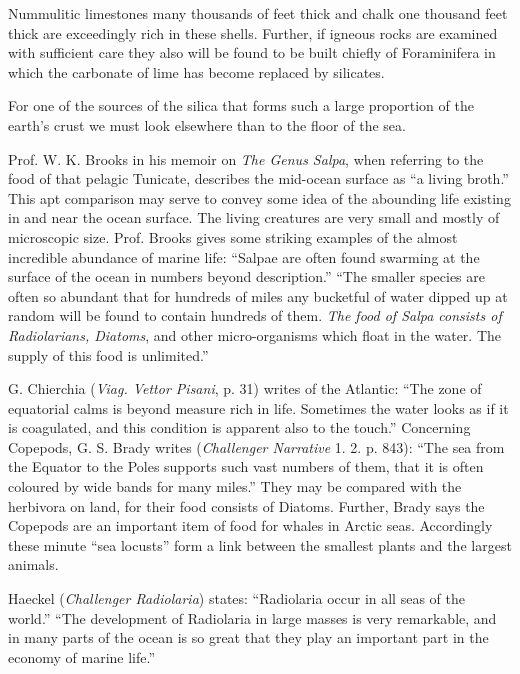 \documentclass[a4paper, 12pt, oneside]{article}
\begin{document}
Nummulitic limestones many thousands of feet thick and chalk one thousand feet thick are exceedingly rich in these shells. Further, if igneous rocks are examined with sufficient care they also will be found to be built chiefly of Foraminifera in which the carbonate of lime has become replaced by silicates.

For one of the sources of the silica that forms such a large proportion of the earth's crust we must look elsewhere than to the floor of the sea.

Prof. W. K. Brooks in his memoir on \emph{The Genus Salpa}, when referring to the food of that pelagic Tunicate, describes the mid-ocean surface as ``a living broth.'' This apt comparison may serve to convey some idea of the abounding life existing in and near the ocean surface. The living creatures are very small and mostly of microscopic size. Prof. Brooks gives some striking examples of the almost incredible abundance of marine life: ``Salpae are often found swarming at the surface of the ocean in numbers beyond description.'' ``The smaller species are often so abundant that for hundreds of miles any bucketful of water dipped up at random will be found to contain hundreds of them. \emph{The food of Salpa consists of Radiolarians, Diatoms}, and other micro-organisms which float in the water. The supply of this food is unlimited.'' 

G. Chierchia (\emph{Viag. Vettor Pisani}, p. 31) writes of the Atlantic: ``The zone of equatorial calms is beyond measure rich in life. Sometimes the water looks as if it is coagulated, and this condition is apparent also to the touch.'' Concerning Copepods, G. S. Brady writes (\emph{Challenger Narrative} 1. 2. p. 843): ``The sea from the Equator to the Poles supports such vast numbers of them, that it is often coloured by wide bands for many miles.'' They may be compared with the herbivora on land, for their food consists of Diatoms. Further, Brady says the Copepods are an important item of food for whales in Arctic seas. Accordingly these minute ``sea locusts'' form a link between the smallest plants and the largest animals. 

Haeckel (\emph{Challenger Radiolaria}) states: ``Radiolaria occur in all seas of the world.'' ``The development of Radiolaria in large masses is very remarkable, and in many parts of the ocean is so great that they play an important part in the economy of marine life.'' 
\end{document}
